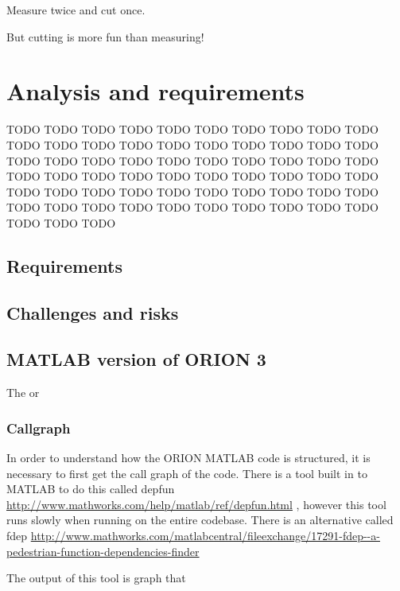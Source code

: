 \begin{savequote}[0.55\linewidth]
	\begin{fancyquote}
		Measure twice and cut once.
	\end{fancyquote}

	\begin{fancyquote}
		But cut\hspace{\fill}ting is more fun than m\quad{}eas\quad{}uri\quad{}ng!
	\end{fancyquote}
\end{savequote}

\chapter{Analysis and requirements}\label{ch:analysis}

TODO TODO TODO
TODO TODO TODO
TODO TODO TODO
TODO TODO TODO
TODO TODO TODO
TODO TODO TODO
TODO TODO TODO
TODO TODO TODO
TODO TODO TODO
TODO TODO TODO
TODO TODO TODO
TODO TODO TODO
TODO TODO TODO
TODO TODO TODO
TODO TODO TODO
TODO TODO TODO
TODO TODO TODO
TODO TODO TODO
TODO TODO TODO
TODO TODO TODO
TODO TODO TODO

\section{Requirements}

\section{Challenges and risks}

\section{MATLAB version of ORION 3}

The or

\subsection{Callgraph}

In order to understand how the ORION MATLAB code is structured, it
is necessary to first get the call graph of the code. There is a
tool built in to MATLAB to do this called
depfun
\url{http://www.mathworks.com/help/matlab/ref/depfun.html} %
, however this tool runs slowly when running on the entire codebase.
There is an alternative called fdep
\url{http://www.mathworks.com/matlabcentral/fileexchange/17291-fdep--a-pedestrian-function-dependencies-finder}

The output of this tool is graph that %


